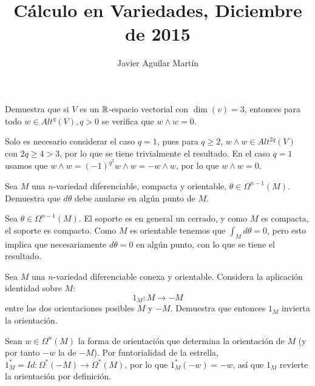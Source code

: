 \documentclass[twoside]{article}
\begin{document}
\title{Cálculo en Variedades, Diciembre de 2015}
\author{Javier Aguilar Martín}
\maketitle


\begin{ejercicio}{1}
Demuestra que si $V$ es un $\mathbb{R}$-espacio vectorial con $\dim(v)=3$, entonces para todo $w\in Alt^q(V), q>0$ se verifica que $w\land w=0$.
\end{ejercicio}
\begin{solucion}
Solo es necesario considerar el caso $q=1$, pues para $q\geq 2$, $w\land w\in Alt^{2q}(V)$ con $2q\geq 4>3$, por lo que se tiene trivialmente el resultado. En el caso $q=1$ usamos que $w\land w=(-1)^{q^2}w\land w=-w\land w$, por lo que $w\land w=0$.


\end{solucion}

\newpage

\begin{ejercicio}{2}
Sea $M$ una $n$-variedad diferenciable, compacta y orientable, $\theta\in\Omega^{n-1}(M)$. Demuestra que $d\theta$ debe anularse en algún punto de $M$.
\end{ejercicio}
\begin{solucion}
Sea $\theta\in\Omega^{n-1}(M)$. El soporte es en general un cerrado, y como $M$ es compacta, el soporte es compacto. Como $M$ es orientable tenemos que $\int_M d\theta=0$, pero esto implica que necesariamente $d\theta=0$ en algún punto, con lo que se tiene el resultado. 
\end{solucion}
\newpage

\begin{ejercicio}{3}
Sea $M$ una $n$-variedad diferenciable conexa y orientable. Considera la aplicación identidad sobre $M$:
\[
1_M:M\to -M
\]
entre las dos orientaciones posibles $M$ y $-M$. Demuestra que entonces $1_M$ invierta la orientación.
\end{ejercicio}
\begin{solucion}
Sean $w\in\Omega^n(M)$ la forma de orientación que determina la orientación de $M$ (y por tanto $-w$ la de $-M$). Por funtorialidad de la estrella, $1_M^*=Id:\Omega^*(-M)\to\Omega^*(M)$, por lo que $1_M^*(-w)=-w$, así que $1_M$ revierte la orientación por definición.
\end{solucion}
\newpage
\end{document}
